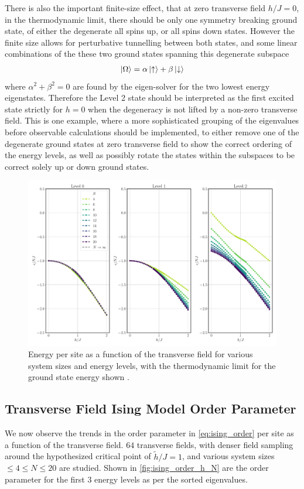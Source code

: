 \documentclass[12pt]{article}{}
\begin{document}
There is also the important finite-size effect, that at zero transverse field $h/J = 0$, in the thermodynamic limit, there should be only one symmetry breaking ground state, of either the degenerate all spins up, or all spins down states. However the finite size allows for perturbative tunnelling between both states, and some linear combinations of the these two ground states spanning this degenerate subspace
\begin{align}
  \ket{\Omega} = \alpha \ket{\uparrow} + \beta \ket{\downarrow}
\end{align}
where $\alpha^2 + \beta^2 = 0$ are found by the eigen-solver for the two lowest energy eigenstates. Therefore the Level 2 state should be interpreted as the first excited state strictly for $h=0$ when the degeneracy is not lifted by a non-zero transverse field. This is one example, where a more sophisticated grouping of the eigenvalues before observable calculations should be implemented, to either remove one of the degenerate ground states at zero transverse field to show the correct ordering of the energy levels, as well as possibly rotate the states within the subspaces to be correct solely up or down ground states.
\begin{figure}[H]
  \centering
  \includegraphics[width=1\textwidth]{figures/ising/energy__h__N.pdf}
  \caption{Energy per site as a function of the transverse field for various system sizes and energy levels, with the thermodynamic limit for the ground state energy shown \cite{Lieb1961}.}
  \label{fig:ising_energy_h_N}
\end{figure}


\subsection{Transverse Field Ising Model Order Parameter}
We now observe the trends in the order parameter in \cref{eq:ising_order} per site as a function of the transverse field. $64$ transverse fields, with denser field sampling around the hypothesized critical point of $\tilde{h}/J = 1$, and various system sizes $\leq 4 \leq N \leq 20$ are studied. Shown in \cref{fig:ising_order_h_N} are the order parameter for the first $3$ energy levels as per the sorted eigenvalues. 
\end{document}
